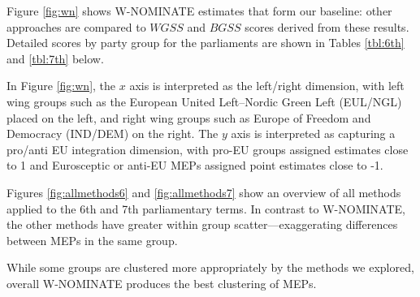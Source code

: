 \documentclass{llncs}
\begin{document}
Figure \ref{fig:wn} shows W-NOMINATE estimates that form our baseline: other approaches are compared to $WGSS$ and $BGSS$ scores derived from these results. Detailed scores by party group for the parliaments are shown in Tables \ref{tbl:6th} and \ref{tbl:7th} below.

In Figure \ref{fig:wn}, the $x$ axis is interpreted as the left/right dimension, with left wing groups such as the European United Left–Nordic Green Left (EUL/NGL) placed on the left, and right wing groups such as Europe of Freedom and Democracy (IND/DEM) on the right. The $y$ axis is interpreted as capturing a pro/anti EU integration dimension, with pro-EU groups assigned estimates close to 1 and Eurosceptic or anti-EU MEPs assigned point estimates close to -1.

Figures \ref{fig:allmethods6} and \ref{fig:allmethods7} show an overview of all methods applied to the 6th and 7th parliamentary terms. In contrast to W-NOMINATE, the other methods have greater within group scatter---exaggerating differences between MEPs in the same group.

While some groups are clustered more appropriately by the methods we explored, overall W-NOMINATE produces the best clustering of MEPs.
\end{document}

